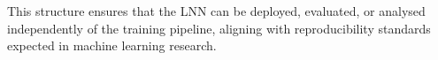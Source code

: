This structure ensures that the LNN can be deployed, evaluated, or analysed independently of the training pipeline, aligning with reproducibility standards expected in machine learning research.






